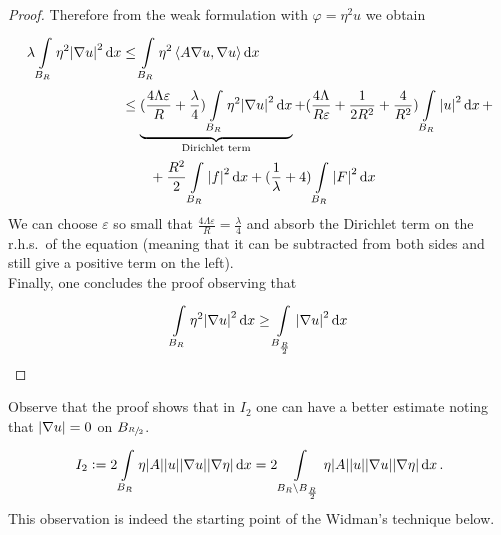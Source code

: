 \begin{proof}
	Therefore from the weak formulation with \( \varphi = \eta^{2} u\) we obtain
	\begin{align}
		\lambda \int\limits_{B_{R}}^{} \eta^{2}\abs{\nabla u}^{2} \dd{x}
		 & \leq \int\limits_{B_{R}}^{} \eta^{2} \left\langle A \nabla u, \nabla u \right\rangle \dd{x}  \\
		 & \leq  \underbrace{(\frac{4 \Lambda \varepsilon}{R}+ \frac{\lambda}{4}) \int\limits_{B_{R}}^{} \eta^{2}\abs{\nabla u}^{2} \dd{x}}_{\text{Dirichlet term}} + (\frac{4 \Lambda}{R \varepsilon}+\frac{1}{2 R^{2}}+\frac{4}{R^{2}}) \int\limits_{B_{R}}^{} \abs{u}^{2} \dd{x} +  \\
		 & \qquad + \frac{R^{2}}{2} \int\limits_{B_{R}}^{} \abs{f}^{2} \dd{x} + (\frac{1}{\lambda}+4) \int\limits_{B_{R}}^{} \abs{F}^{2} \dd{x}
	\end{align}
	We can choose \(\varepsilon \) so small that \(\frac{4 \Lambda \varepsilon}{R} = \frac{\lambda}{4}\) and absorb the Dirichlet term on the r.h.s.\ of the equation (meaning that it can be subtracted from both sides and still give a positive term on the left).\\
	Finally, one concludes the proof observing that
	\begin{gather}
		\int\limits_{B_{R}}^{} \eta^{2}\abs{\nabla u}^{2} \dd{x} \geq \int\limits_{B_{\frac{R}{2}}}^{} \abs{\nabla u}^{2} \dd{x}
	\end{gather}
\end{proof}
Observe that the proof shows that in \(I_{2}\) one can have a better estimate noting that \(\abs{\nabla u}=0\) on \(B_{\sfrac{R}{2}}\).
\begin{gather}
	I_{2}:= 2 \int\limits_{B_{R}}^{} \eta \abs{A} \abs{u}\abs{\nabla u}\abs{\nabla \eta} \dd{x} = 2 \int\limits_{B_{R}\setminus B_{\frac{R}{2}}}^{} \eta \abs{A}\abs{u}\abs{\nabla u}\abs{\nabla \eta} \dd{x}.
\end{gather}
This observation is indeed the starting point of the Widman's technique below.

